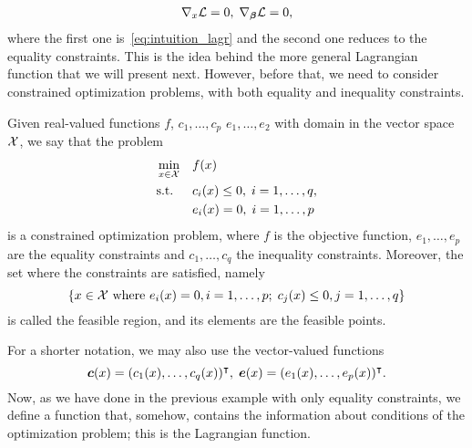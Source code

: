 \begin{equation}\nonumber
    \begin{aligned}
        \nabla_x {\mathcal{L}}= 0, \; \nabla_{\bm{\beta}} {\mathcal{L}}= 0,
    \end{aligned}
\end{equation}
where the first one is~\eqref{eq:intuition_lagr} and the second one reduces to the equality constraints.
This is the idea behind the more general Lagrangian function that we will present next. 
However, before that, we need to consider constrained optimization problems, with both equality and inequality constraints.
\begin{definition}
    Given real-valued functions $f$, $c_1, \ldots, c_p$ $e_1, \ldots, e_2$ with domain in the vector space $\mathcal{X}$,
    we say that the problem
    \begin{equation}\label{eq:optproblem_def}
        \begin{aligned}
            &\min_{x \in \vecspace} & & f(x) \\
            & \text{s.t.} & & c_i(x) \leq 0,\; i=1, \ldots, q , \\
            & & & e_i(x) = 0,\; i=1, \ldots, p              
        \end{aligned}
    \end{equation}
    is a constrained optimization problem, where $f$ is the objective function, $e_1, \ldots, e_p$ are the equality constraints and $c_1, \ldots, c_q$ the inequality constraints.
    Moreover, the set where the constraints are satisfied, namely
    \begin{equation}
        \nonumber
        \left\{x \in \mathcal{X} \text{ where } e_i(x)=0, i=1, \ldots, p; \; c_j(x)\leq 0, j=1, \ldots, q\right\}
    \end{equation}
    is called the feasible region, and its elements are the feasible points.
\end{definition}
For a shorter notation, we may also use the vector-valued functions 
$$\bm{c}(x) = (c_1(x), \ldots, c_q(x))^\intercal, \; \bm{e}(x) = (e_1(x), \ldots, e_p(x))^\intercal .   $$
Now, as we have done in the previous example with only equality constraints, we define a function that, somehow, contains the information about conditions of the optimization problem; this is the Lagrangian function.
